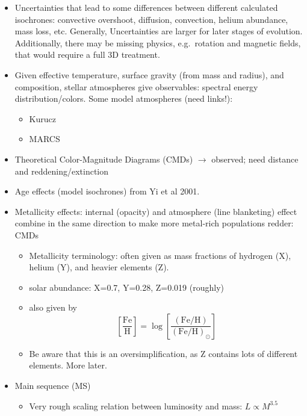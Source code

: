 \documentclass{article}
\begin{document}
\begin{itemize}
    \item Uncertainties that lead to some differences between different
        calculated isochrones: convective overshoot, diffusion, convection,
        helium abundance, mass loss, etc. Generally, Uncertainties are larger
        for later stages of evolution. Additionally, there may be missing
        physics, e.g.\ rotation and magnetic fields, that would require a full
        3D treatment.
    \item Given effective temperature,
        surface gravity (from mass and radius), and composition,
        stellar atmospheres give observables: spectral energy
        distribution/colors. Some model atmospheres (need links!):
        \begin{itemize}
            \item {Kurucz}
            \item {MARCS}
        \end{itemize}
    \item Theoretical Color-Magnitude Diagrams (CMDs) $\rightarrow$
      observed; need distance and reddening/extinction
    \item Age effects (model isochrones) from Yi et al 2001.
    \item Metallicity effects: internal (opacity) and atmosphere
      (line blanketing) effect combine in the same direction to make
      more metal-rich populations redder: CMDs
      \begin{itemize}
          \item Metallicity terminology: often given as mass fractions of
              hydrogen (X), helium (Y), and heavier elements (Z).
          \item solar abundance: X=0.7, Y=0.28, Z=0.019 (roughly)
          \item also given by
              $$ \left[\frac{\textrm{Fe}}{\textrm{H}}\right] =
              \log\left[
              \frac{\left( {\textrm{Fe}}/{\textrm{H}} \right)}
              {\left({\textrm{Fe}}/{\textrm{H}}\right)_{\odot}}
              \right]$$
          \item Be aware that this is an oversimplification, as Z contains
              lots of different elements. More later.
      \end{itemize}
    \item Main sequence (MS)
        \begin{itemize}
            \item Very rough scaling relation between luminosity and mass:
                $ L \propto M^{3.5} $

\end{itemize}
\end{itemize}
\end{document}
